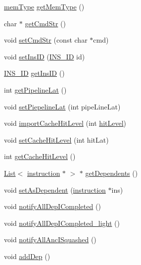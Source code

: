 \begin{DoxyCompactItemize}
\item 
\hyperlink{binaryTranslator_2global_8h_a94b8423a23b95a7adac22848b81e7c0c}{memType} \hyperlink{classinstruction_a8051847b8731d697107d682564a7385f}{getMemType} ()
\item 
char $\ast$ \hyperlink{classinstruction_a95d2dc965b2b6bb037d31af748b98d30}{getCmdStr} ()
\item 
void \hyperlink{classinstruction_adc61c4f03b740668fa8bf4b3e213f8f3}{setCmdStr} (const char $\ast$cmd)
\item 
void \hyperlink{classinstruction_a3ad74e598e69178490590655303466a1}{setInsID} (\hyperlink{global_2global_8h_a1883c47d0023d0f200e1d86eced6a070}{INS\_\-ID} id)
\item 
\hyperlink{global_2global_8h_a1883c47d0023d0f200e1d86eced6a070}{INS\_\-ID} \hyperlink{classinstruction_a0856c8a7411c298a51cd8d8d5e2f8b12}{getInsID} ()
\item 
int \hyperlink{classinstruction_a6691b4bcb64ecd50e0aea3a0558137d0}{getPipelineLat} ()
\item 
void \hyperlink{classinstruction_a331fb003e92ca7a8b86d95157ecbd122}{setPiepelineLat} (int pipeLineLat)
\item 
void \hyperlink{classinstruction_a94d61291db685cc1c3abb2bb72481b3a}{importCacheHitLevel} (int \hyperlink{cacheCtrl_8cpp_a60025585bccd1055da0bdf1b5877a3fe}{hitLevel})
\item 
void \hyperlink{classinstruction_a060fa401d6b45027f08d827ef2ceb114}{setCacheHitLevel} (int hitLat)
\item 
int \hyperlink{classinstruction_a722d3e54a39d82832a6f9769602ff967}{getCacheHitLevel} ()
\item 
\hyperlink{classList}{List}$<$ \hyperlink{classinstruction}{instruction} $\ast$ $>$ $\ast$ \hyperlink{classinstruction_ad1af63e7f1bfa160b0719027c2a0b8ce}{getDependents} ()
\item 
void \hyperlink{classinstruction_ab2ba6828f1256186a787d933a6ca0868}{setAsDependent} (\hyperlink{classinstruction}{instruction} $\ast$ins)
\item 
void \hyperlink{classinstruction_a4d6726de4186f3010dd064582d4637d4}{notifyAllDepICompleted} ()
\item 
void \hyperlink{classinstruction_a6308dc145beb4a8ee6ccace0ed9f8cdd}{notifyAllDepICompleted\_\-light} ()
\item 
void \hyperlink{classinstruction_abe8f9b353e303a39ab97f1d4bebba101}{notifyAllAncISquashed} ()
\item 
void \hyperlink{classinstruction_aeb756cec429aca99a341f069df268465}{addDep} ()

\end{DoxyCompactItemize}

